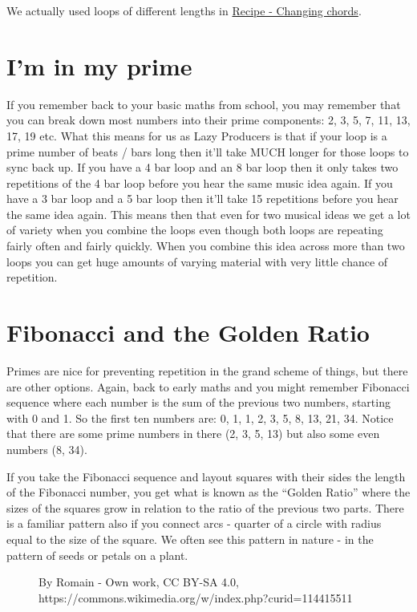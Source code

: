 \documentclass[
  12pt,
  letterpaper,
  oneside,
  open=any]{scrbook}
\makeatletter
\newcommand*\pandocbounded[1]{%
  \sbox\pandoc@box{#1}%
  \Gscale@div\@tempa{\textheight}{\dimexpr\ht\pandoc@box+\dp\pandoc@box\relax}%
  \Gscale@div\@tempb{\linewidth}{\wd\pandoc@box}%
  \ifdim\@tempb\p@<\@tempa\p@\let\@tempa\@tempb\fi%
  \ifdim\@tempa\p@<\p@\scalebox{\@tempa}{\usebox\pandoc@box}%
  \else\usebox{\pandoc@box}%
  \fi%
}
\makeatother
\begin{document}
We actually used loops of different lengths in
\hyperref[001-Recipe-Changing_Chords]{Recipe - Changing chords}.

\section{I'm in my prime}\label{im-in-my-prime}

If you remember back to your basic maths from school, you may remember
that you can break down most numbers into their prime components: 2, 3,
5, 7, 11, 13, 17, 19 etc. What this means for us as Lazy Producers is
that if your loop is a prime number of beats / bars long then it'll take
MUCH longer for those loops to sync back up. If you have a 4 bar loop
and an 8 bar loop then it only takes two repetitions of the 4 bar loop
before you hear the same music idea again. If you have a 3 bar loop and
a 5 bar loop then it'll take 15 repetitions before you hear the same
idea again. This means then that even for two musical ideas we get a lot
of variety when you combine the loops even though both loops are
repeating fairly often and fairly quickly. When you combine this idea
across more than two loops you can get huge amounts of varying material
with very little chance of repetition.

\section{Fibonacci and the Golden
Ratio}\label{fibonacci-and-the-golden-ratio}

Primes are nice for preventing repetition in the grand scheme of things,
but there are other options. Again, back to early maths and you might
remember Fibonacci sequence where each number is the sum of the previous
two numbers, starting with 0 and 1. So the first ten numbers are: 0, 1,
1, 2, 3, 5, 8, 13, 21, 34. Notice that there are some prime numbers in
there (2, 3, 5, 13) but also some even numbers (8, 34).

If you take the Fibonacci sequence and layout squares with their sides
the length of the Fibonacci number, you get what is known as the
``Golden Ratio'' where the sizes of the squares grow in relation to the
ratio of the previous two parts. There is a familiar pattern also if you
connect arcs - quarter of a circle with radius equal to the size of the
square. We often see this pattern in nature - in the pattern of seeds or
petals on a plant.

\begin{figure}[H]

{\centering \pandocbounded{\texttt{[image: images/Fibonacci\_Spiral.png]}}

}

\caption{By Romain - Own work, CC BY-SA 4.0,
https://commons.wikimedia.org/w/index.php?curid=114415511}

\end{figure}%
\end{document}
